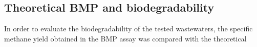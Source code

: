 \subsection{Theoretical BMP and biodegradability}
In order to evaluate the biodegradability of the tested wastewaters, the specific methane yield obtained in the BMP assay was compared with the theoretical
